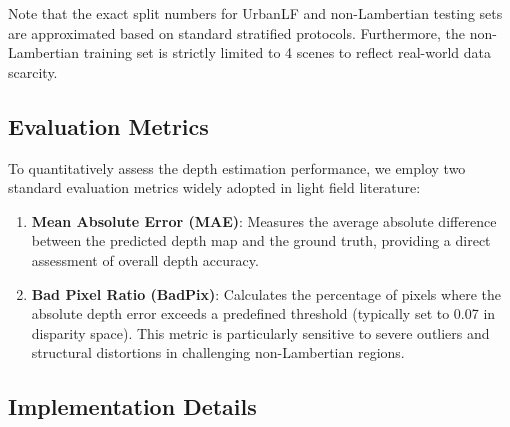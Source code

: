 \documentclass[lettersize,journal]{IEEEtran}
\begin{document}
\begin{table}[!t]
\caption{Summary of the Datasets Used in the Experiments}\label{tab:datasets}
\centering\small
{}
\end{table}

Note that the exact split numbers for UrbanLF and non-Lambertian testing sets are approximated based on standard stratified protocols. Furthermore, the non-Lambertian training set is strictly limited to 4 scenes to reflect real-world data scarcity.

\subsection{Evaluation Metrics}

To quantitatively assess the depth estimation performance, we employ two standard evaluation metrics widely adopted in light field literature:
\begin{enumerate}
\item \textbf{Mean Absolute Error (MAE)}: Measures the average absolute difference between the predicted depth map and the ground truth, providing a direct assessment of overall depth accuracy.
\item \textbf{Bad Pixel Ratio (BadPix)}: Calculates the percentage of pixels where the absolute depth error exceeds a predefined threshold (typically set to 0.07 in disparity space). This metric is particularly sensitive to severe outliers and structural distortions in challenging non-Lambertian regions.
\end{enumerate}

\subsection{Implementation Details}
\end{document}
